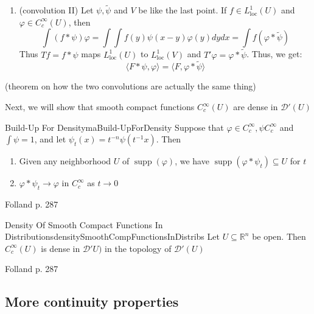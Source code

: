 \documentclass{book}
\newenvironment{Proof}[1][]
  {\begin{ProofTcb}[#1]}
  {\end{ProofTcb}}
\newcommand{\R}{{\mathbb{R}}}
\newcommand{\CD}{{\mathcal{D}}}
\newcommand{\sse}{\subseteq}
\renewcommand{\phi}{\varphi}
\newcommand{\rw}{\rightarrow}
\newcommand{\supp}{\operatorname{supp}}
\begin{document}
\begin{enumerate}
\[		\]
		Since $\tau_x \tilde{\psi} \rw \tau_{x_0} \tilde{\psi}$ as $x \rw x_0$, $F*\psi$ is a continuous function (in
		fact, $C^\infty$, as we'll show in a moment). A pertinent example of this is the following:
		\[
			\delta * \psi(x) = \langle \delta, \tau_x \tilde{\psi}\rangle = \tau_x \tilde{\psi(0)} = \psi(x)
		\]
		so $\delta$ is the multiplicative identity of convolution!
	\item (convolution II) Let $\psi, \tilde{\psi}$ and $V$ be like the last point. If $f \in L_{\text{loc}}^1(U)$ and
		$\phi \in C_c^\infty(U)$, then
		\[
			\int (f*\psi)\phi = \int\int f(y)\psi(x-y)\phi(y)dydx = \int f(\phi*\tilde{\psi})
		\]
		Thus $Tf = f*\psi$ maps $L_{\text{loc}}^1(U)$ to $L_{\text{loc}}^1(V)$ and $T'\phi = \phi* \tilde{\psi}$. Thus,
		we get:
		\[
			\langle F*\psi, \phi\rangle = \langle F, \phi*\tilde{\psi}\rangle
		\]
\end{enumerate}

(theorem on how the two convolutions are actually the same thing)

Next, we will show that smooth compact functions $C_c^\infty(U)$ are dense in $\CD'(U)$

\begin{lem}{Build-Up For Density}{maBuild-UpForDensity}
	Suppose that $\phi \in C_c^\infty, \psi C_c^\infty$ and $\int \psi = 1$, and let $\psi_t(x) = t^{-n}\psi(t^{-1}x)$.
	Then
	\begin{enumerate}
		\item Given any neighborhood $U$ of $\supp(\phi)$, we have $\supp(\phi* \psi_t) \sse U$ for $t$
		\item $\phi * \psi_t \rw \phi$ in $C_c^\infty$ as $t \rw 0$
	\end{enumerate}
\end{lem}

\begin{Proof}
	Folland p. 287
\end{Proof}


\begin{prop}{Density Of Smooth Compact Functions In Distributions}{densitySmoothCompFunctionsInDistribs}
	Let $U \sse \R^n$ be open. Then $C_c^\infty(U)$ is dense in $\CD'U)$ in the topology of $\CD'(U)$
\end{prop}

\begin{Proof}
	Folland p. 287
\end{Proof}

\subsection{More continuity properties}
\end{document}
